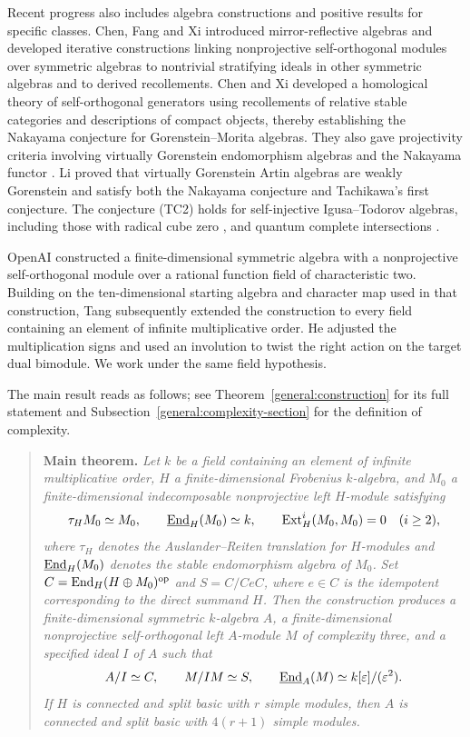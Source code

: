 \documentclass[11pt]{article}
\begin{document}
Recent progress also includes algebra constructions and positive results
for specific classes. Chen, Fang and Xi \cite{CFX} introduced
mirror-reflective algebras and developed iterative constructions linking
nonprojective self-orthogonal modules over symmetric algebras to
nontrivial stratifying ideals in other symmetric algebras and to derived
recollements. Chen and Xi \cite{CXSO} developed a homological theory of
self-orthogonal generators using recollements of relative stable
categories and descriptions of compact objects, thereby establishing the
Nakayama conjecture for Gorenstein--Morita algebras. They also gave
projectivity criteria involving virtually Gorenstein endomorphism
algebras and the Nakayama functor \cite{CXVG}. Li \cite{LiVG} proved that virtually Gorenstein
Artin algebras are weakly Gorenstein and satisfy both the Nakayama
conjecture and Tachikawa's first conjecture. The conjecture (TC2) holds
for self-injective Igusa--Todorov algebras, including those with radical
cube zero \cite{ZZ}, and quantum complete intersections \cite{Xia}.

OpenAI \cite{O} constructed a finite-dimensional symmetric algebra
with a nonprojective self-orthogonal module over a rational function
field of characteristic two. Building on the ten-dimensional
starting algebra and character map used in that construction,
Tang \cite{F} subsequently extended the construction to every field
containing an element of infinite multiplicative order. He adjusted
the multiplication signs and used an involution to twist the right
action on the target dual bimodule. We work under the same field
hypothesis.

The main result reads as follows; see Theorem~\ref{general:construction}
for its full statement and Subsection~\ref{general:complexity-section}
for the definition of complexity.
\begin{quote}
\textbf{Main theorem.}
\emph{Let $k$ be a field containing an element of infinite
multiplicative order, $H$ a finite-dimensional Frobenius $k$-algebra, and $M_0$ a finite-dimensional indecomposable nonprojective left $H$-module satisfying}
\[
 \tau_HM_0\simeq M_0,\qquad \underline{{\rm End}}_H(M_0)\simeq k,\qquad
 {\rm Ext}_H^i(M_0,M_0)=0\quad(i\ge2),
\]
\emph{where $\tau_H$ denotes the Auslander--Reiten translation
for $H$-modules and $\underline{{\rm End}}_H(M_0)$ denotes the stable
endomorphism algebra of $M_0$.}
\emph{Set $C={\rm End}_H(H\oplus M_0)^{\mathrm{op}}$ and
$S=C/CeC$, where $e\in C$ is the idempotent corresponding to the direct summand $H$. Then the construction
produces a finite-dimensional symmetric $k$-algebra $A$, a finite-dimensional
nonprojective self-orthogonal left $A$-module $M$ of complexity three, and a specified
ideal $I$ of $A$ such that}
\[
 A/I\simeq C,\qquad M/IM\simeq S,\qquad
 \underline{{\rm End}}_A(M)\simeq k[\varepsilon]/(\varepsilon^2).
\]
\emph{If $H$ is connected and split basic with $r$ simple modules,
then $A$ is connected and split basic with $4(r+1)$ simple modules.}
\end{quote}
\end{document}
